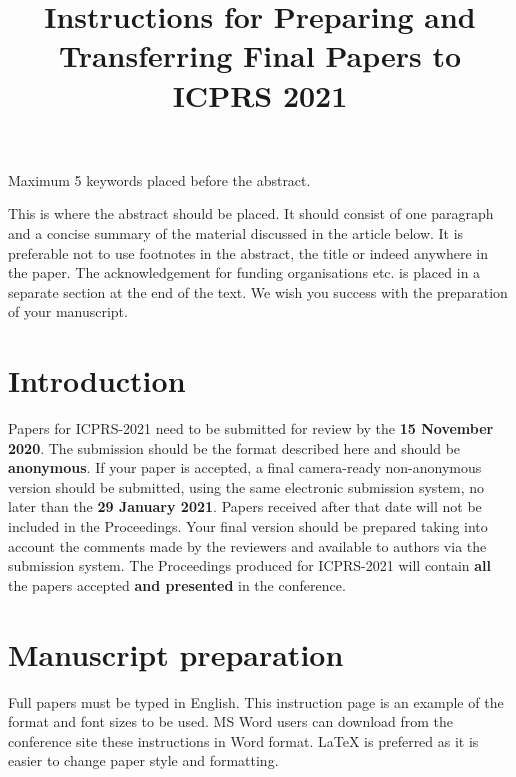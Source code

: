 \documentclass[10pt,twocolumn]{article}
\begin{document}
\noindent



\title{Instructions for Preparing and Transferring Final Papers to \\ICPRS 2021}


\maketitle

\keywords
Maximum 5 keywords placed before the abstract.

\abstract
This is where the abstract should be placed. It should consist
of one paragraph and a concise summary of the material
discussed in the article below. It is preferable not to use
footnotes in the abstract, the title or indeed anywhere in the paper. The acknowledgement
for funding organisations etc. is placed in a separate section at
the end of the text. We wish you success with the preparation
of your manuscript.

\section{Introduction}
Papers for ICPRS-2021 need to be submitted for review by the \textbf{15 November 2020}. The submission should be the format described here and should be \textbf{anonymous}. If your paper is accepted, a final camera-ready non-anonymous version should be submitted, using the same electronic submission system, no later than the \textbf{29 January 2021}. Papers received after that date will not be included in the Proceedings. Your final version should be prepared taking into account the comments made by the reviewers and available to authors via the submission system. The Proceedings produced for ICPRS-2021 will contain \textbf{all} the papers accepted \textbf{and presented} in the conference.  

\section{Manuscript preparation}
Full papers must be typed in English. This instruction page is
an example of the format and font sizes to be used. MS Word
users can download from the conference site these
instructions in Word format. LaTeX is preferred as it is easier to change paper style and formatting.
\end{document}
